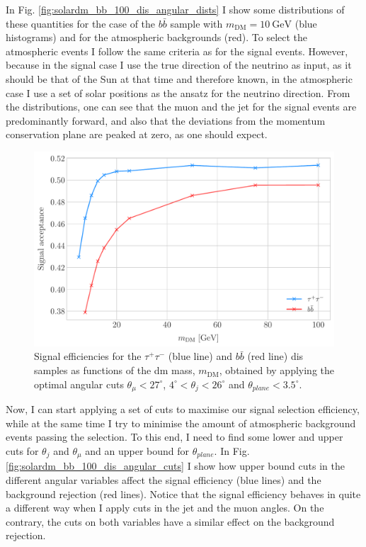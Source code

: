 In Fig. \ref{fig:solardm_bb_100_dis_angular_dists} I show some distributions of these quantities for the case of the $b\bar{b}$ sample with $m_{\mathrm{DM}} = 10 \ \mathrm{GeV}$ (blue histograms) and for the atmospheric backgrounds (red). To select the atmospheric events I follow the same criteria as for the signal events. However, because in the signal case I use the true direction of the neutrino as input, as it should be that of the Sun at that time and therefore known, in the atmospheric case I use a set of solar positions as the ansatz for the neutrino direction. From the distributions, one can see that the muon and the jet for the signal events are predominantly forward, and also that the deviations from the momentum conservation plane are peaked at zero, as one should expect.

\begin{figure}[t]
	\centering
	\includegraphics[width=0.9\linewidth]{Images/DM_Analysis/solardm_dis_signal_acceptance.pdf}
	\caption[Signal efficiencies for the $\tau^{+} \tau^{-}$ and $b\bar{b}$ \gls{dis} samples as functions of the \gls{dm} mass.]{Signal efficiencies for the $\tau^{+} \tau^{-}$ (blue line) and $b\bar{b}$ (red line) \gls{dis} samples as functions of the \gls{dm} mass, $m_{\mathrm{DM}}$, obtained by applying the optimal angular cuts $\theta_{\mu} < 27^{\circ}$, $4^{\circ} < \theta_{j} < 26^{\circ}$ and $\theta_{plane} < 3.5^{\circ}$.}
	\label{fig:solardm_dis_efficiency}
\end{figure}

Now, I can start applying a set of cuts to maximise our signal selection efficiency, while at the same time I try to minimise the amount of atmospheric background events passing the selection. To this end, I need to find some lower and upper cuts for $\theta_{j}$ and $\theta_{\mu}$ and an upper bound for $\theta_{plane}$. In Fig. \ref{fig:solardm_bb_100_dis_angular_cuts} I show how upper bound cuts in the different angular variables affect the signal efficiency (blue lines) and the background rejection (red lines). Notice that the signal efficiency behaves in quite a different way when I apply cuts in the jet and the muon angles. On the contrary, the cuts on both variables have a similar effect on the background rejection.

